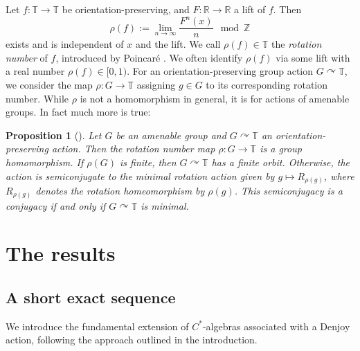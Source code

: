 \documentclass[11pt,a4paper,leqno]{amsart}
\newtheorem{prop}[thm]{Proposition}
\theoremstyle{definition}
\theoremstyle{remark}
\numberwithin{equation}{section}
\theoremstyle{plain}
\newcommand{\Tb}{\mathbb{T}}
\newcommand{\Rb}{\mathbb{R}}
\begin{document}
Let $f : \Tb \to \Tb$ be orientation-preserving, and $F : \Rb \to \Rb$ a lift of $f$. Then 
\[
\rho(f) := \lim_{n\to\infty} \frac{F^n(x)}{n} \mod \mathbb Z
\]
exists and is independent of $x$ and the lift. We call $\rho(f) \in \mathbb T$ the \emph{rotation number} of $f$, introduced by Poincar\'e \cite[p.~233]{Poi90}. We often identify $\rho(f)$ via some lift with a real number $\rho(f)\in [0,1)$. For an orientation-preserving group action $G\curvearrowright \mathbb{T}$, we consider the map $\rho : G \to \mathbb{T}$ assigning $g\in G$ to its corresponding rotation number. While $\rho$ is not a homomorphism in general, it is for actions of amenable groups. In fact much more is true: 

\begin{prop}[{\cite[Proposition 6.17]{Ghy01}}]\label{P-amen}
	Let $G$ be an amenable group and $G\curvearrowright \Tb$ an orientation-preserving action. Then the rotation number map $\rho : G \to \mathbb{T}$ is a group homomorphism. If $\rho(G)$ is finite, then $G\curvearrowright \mathbb{T}$ has a finite orbit. Otherwise, the action is semiconjugate to the minimal rotation action given by $g\mapsto R_{\rho(g)}$, where $R_{\rho(g)}$ denotes the rotation homeomorphism by $\rho(g)$. This semiconjugacy is a conjugacy if and only if $G\curvearrowright \Tb$ is minimal. 
\end{prop}

\section{The results}

\subsection{A short exact sequence}\label{sec:extension}

We introduce the fundamental extension of $C^*$-algebras associated with a Denjoy action, following the approach outlined in the introduction. 
\end{document}
